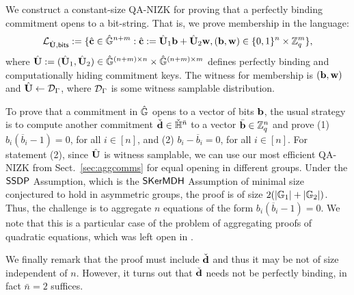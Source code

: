 \label{sec:instantiations}
We construct a constant-size QA-NIZK for proving that a perfectly binding commitment opens to a 
bit-string.  That is, we prove membership in the language:
$$\mathcal{\mathcal{L}}_{{\hat{\mathbf{{U}}}},\mathsf{bits}} := 
    \{\hat{\mathbf{c}} \in {\ensuremath{\hat{\mathbb{G}}}}^{n+m}: 
        \hat{\mathbf{c}}:=  {\hat{\mathbf{{U}}}}_1 \mathbf{b}+ {\hat{\mathbf{{U}}}}_2 \mathbf{w}, (\mathbf{b},\mathbf{w}) \in \{0,1\}^{n} \times \mathbb{Z}_q^{m}
    \},$$
     where ${\hat{\mathbf{{U}}}}:=({\hat{\mathbf{{U}}}}_1,{\hat{\mathbf{{U}}}}_2)\in{\ensuremath{\hat{\mathbb{G}}}}^{(n+m)\times n}\times{\ensuremath{\hat{\mathbb{G}}}}^{(n+m)\times m}$ 
defines perfectly binding and computationally hiding commitment keys. The witness for membership is 
$(\mathbf{b},\mathbf{w})$ and ${\hat{\mathbf{{U}}}} \gets \mathcal{D}_{\Gamma}$, where $\mathcal{D}_\Gamma$ is some witness samplable distribution. 

To prove that a commitment in ${\hat{\mathbb{G}}}$ opens to a vector of bits $\mathbf{b}$, the usual strategy is to compute another commitment $\check{\mathbf{d}}\in{\ensuremath{\check{\mathbb{H}}}}^{\bar{n}}$ to a vector $\bar{\mathbf{b}}\in\mathbb{Z}_q^n$ and prove 
  (1) $b_i(\overline{b}_i-1)=0$, for all $i \in [n]$, and 
  (2) $b_i-\overline{b}_i=0$, for all $i \in [n]$. 
For statement  (2), since ${\hat{\mathbf{{U}}}}$ is witness samplable, we can use our most efficient QA-NIZK from Sect.\ \ref{sec:aggcomms} for equal opening in different groups.  Under the $\mathsf{SSDP}$ Assumption, which is the $\mathsf{SKerMDH}$ Assumption of minimal size conjectured to hold in asymmetric groups, the proof is of size $2(|\mathbb{G}_1|+|\mathbb{G}_2|)$. Thus, the challenge is to aggregate $n$ equations of the form $b_i(\overline{b}_i-1)=0$. We note that this is a particular case of the problem of aggregating proofs of quadratic equations, which was left open in \cite{C:JutRoy14}.

We finally remark that the proof must include $\check{\mathbf{d}}$ and thus it may be not of size independent of $n$. However, it turns out that $\check{\mathbf{d}}$ needs not be perfectly binding, in fact $\bar{n}=2$ suffices.

